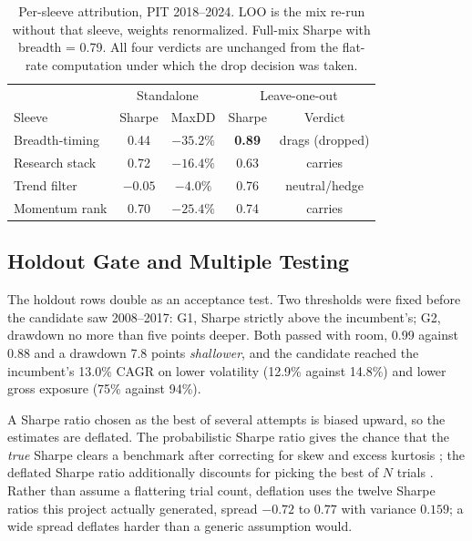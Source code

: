 \documentclass[conference]{IEEEtran}
\begin{document}
\begin{table}[!tb]
\caption{Per-sleeve attribution, PIT 2018--2024. LOO is the mix re-run without
that sleeve, weights renormalized. Full-mix Sharpe with breadth = 0.79. All
four verdicts are unchanged from the flat-rate computation under which the
drop decision was taken.}
\label{tab:loo}
\centering
\setlength{\tabcolsep}{4pt}
\footnotesize
\begin{tabular}{lcccc}
\toprule
& \multicolumn{2}{c}{Standalone} & \multicolumn{2}{c}{Leave-one-out} \\
Sleeve & Sharpe & MaxDD & Sharpe & Verdict \\
\midrule
Breadth-timing & 0.44 & $-35.2\%$ & \textbf{0.89} & drags (dropped) \\
Research stack & 0.72 & $-16.4\%$ & 0.63 & carries \\
Trend filter & $-0.05$ & $-4.0\%$ & 0.76 & neutral/hedge \\
Momentum rank & 0.70 & $-25.4\%$ & 0.74 & carries \\
\bottomrule
\end{tabular}
\end{table}

\subsection{Holdout Gate and Multiple Testing}
\label{sec:dsr}

The holdout rows double as an acceptance test. Two thresholds were fixed before
the candidate saw 2008--2017: G1, Sharpe strictly above the incumbent's; G2,
drawdown no more than five points deeper. Both passed with room, 0.99 against
0.88 and a drawdown 7.8 points \emph{shallower}, and the candidate reached the
incumbent's 13.0\% CAGR on lower volatility (12.9\% against 14.8\%) and lower
gross exposure (75\% against 94\%).

A Sharpe ratio chosen as the best of several attempts is biased upward, so the
estimates are deflated. The probabilistic Sharpe ratio gives the chance that
the \emph{true} Sharpe clears a benchmark after correcting for skew and excess
kurtosis \cite{bailey2012psr}; the deflated Sharpe ratio additionally discounts
for picking the best of $N$ trials \cite{bailey2014deflated,harvey2016cross}.
Rather than assume a flattering trial count, deflation uses the twelve Sharpe
ratios this project actually generated, spread $-0.72$ to $0.77$ with variance
$0.159$; a wide spread deflates harder than a generic assumption would.
\end{document}
